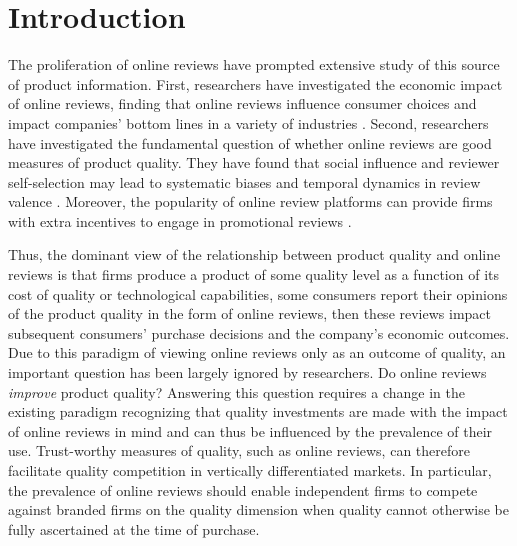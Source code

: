 \documentclass[mksc,blindrev]{informs3} %
\begin{document}
\section{Introduction} \label{sec:introduction}

The proliferation of online reviews have prompted extensive study of this source of product information. First, researchers have investigated the economic impact of online reviews, finding that online reviews influence consumer choices and impact companies' bottom lines in a variety of industries \citep{chevalier2006effect,luca2011reviews,hollenbeck2018}. Second, researchers have investigated the fundamental question of whether online reviews are good measures of product quality. They have found that social influence and reviewer self-selection may lead to systematic biases and temporal dynamics in review valence \citep{hu2006can, moe2012online, mcauley2013amateurs}. Moreover, the popularity of online review platforms can provide firms with extra incentives to engage in promotional reviews \citep{mayzlin2014promotional}. 

Thus, the dominant view of the relationship between product quality and online reviews  is that firms produce a product of some quality level as a function of its cost of quality or technological capabilities, some consumers report their opinions of the product quality in the form of online reviews, then these reviews impact subsequent consumers' purchase decisions and the company's economic outcomes. Due to this paradigm of viewing online reviews only as an outcome of quality, an important question has been largely ignored by researchers. Do online reviews \textit{improve} product quality? Answering this question requires a change in the existing paradigm recognizing that quality investments are made with the impact of online reviews in mind and can thus be influenced by the prevalence of their use. Trust-worthy measures of quality, such as online reviews, can therefore facilitate quality competition in vertically differentiated markets. In particular, the prevalence of online reviews should enable independent firms to compete against branded firms on the quality dimension when quality cannot otherwise be fully ascertained at the time of purchase.
\end{document}
